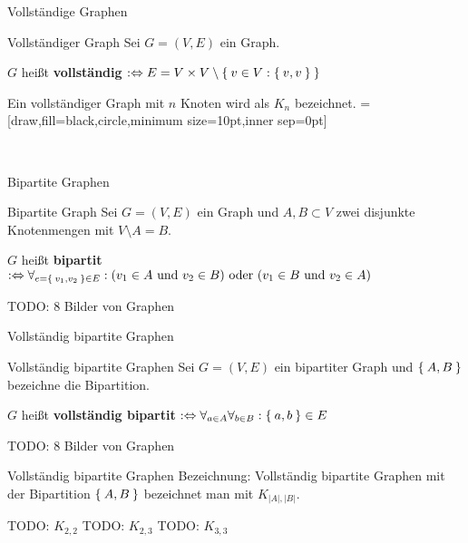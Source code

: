 \begin{frame}{Vollständige Graphen}
\begin{block}{Vollständiger Graph}
Sei $G = (V, E)$ ein Graph.

$G$ heißt \textbf{vollständig} $:\Leftrightarrow E = V \times V \setminus \Set{v \in V: \Set{v, v}}$
\end{block}

Ein vollständiger Graph mit $n$ Knoten wird als $K_n$ bezeichnet.
\pause
{}=[draw,fill=black,circle,minimum size=10pt,inner sep=0pt]
\begin{gallery}
    \\
\end{gallery}
\end{frame}

\begin{frame}{Bipartite Graphen}
\begin{block}{Bipartite Graph}
Sei $G = (V, E)$ ein Graph und $A, B \subset V$ zwei disjunkte Knotenmengen mit
$V \setminus A = B$.

$G$ heißt \textbf{bipartit} $:\Leftrightarrow \forall_{e = \Set{v_1, v_2} \in E}: (v_1 \in A \text{ und } v_2 \in B) \text{ oder } (v_1 \in B \text{ und } v_2 \in A) $
\end{block}

TODO: 8 Bilder von Graphen
\end{frame}

\begin{frame}{Vollständig bipartite Graphen}
\begin{block}{Vollständig bipartite Graphen}
Sei $G = (V, E)$ ein bipartiter Graph und $\Set{A, B}$ bezeichne die Bipartition.

$G$ heißt \textbf{vollständig bipartit} $:\Leftrightarrow \forall_{a \in A} \forall_{b \in B}: \Set{a, b} \in E$
\end{block}

TODO: 8 Bilder von Graphen
\end{frame}

\begin{frame}{Vollständig bipartite Graphen}
Bezeichnung: Vollständig bipartite Graphen mit der Bipartition $\Set{A, B}$ 
bezeichnet man mit $K_{|A|, |B|}$.

TODO: $K_{2,2}$
TODO: $K_{2,3}$
TODO: $K_{3,3}$
\end{frame}

